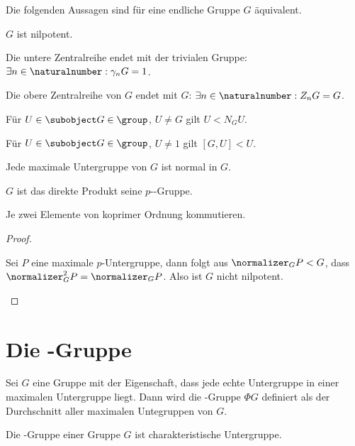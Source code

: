\begin{theorem}
    Die folgenden Aussagen sind für eine endliche Gruppe $G$ äquivalent.
    \begin{statements}
            \item $G$ ist nilpotent.
            \item Die untere Zentralreihe endet mit der trivialen Gruppe: $\exists n\in\naturalnumber:\gamma_n G = 1$.
            \item Die obere Zentralreihe von $G$ endet mit $G$: $\exists n\in\naturalnumber : Z_n G = G$.
            \item Für $U\in\subobject G\in\group$, $U\neq G$ gilt $U<N_G U$.
            \item Für $U\in\subobject G\in\group$, $U\neq 1$ gilt $[G,U]<U$.
            \item Jede maximale Untergruppe von $G$ ist normal in $G$.
            \item $G$ ist das direkte Produkt seine $p$--Gruppe.
            \item Je zwei Elemente von koprimer Ordnung kommutieren.
    \end{statements}
\end{theorem}

\begin{proof}
    \begin{statements}
        \item Sei $P$ eine maximale $p$-Untergruppe, dann folgt aus $\normalizer_G P < G$, dass $\normalizer^2_G P = \normalizer_G
    P$. Also ist $G$ nicht nilpotent.
    \end{statements}
\end{proof}

\section{Die -Gruppe}

\begin{definition}
    Sei $G$ eine Gruppe mit der Eigenschaft, dass jede echte Untergruppe in einer maximalen Untergruppe liegt. Dann wird die -Gruppe $\Phi G$ definiert als der Durchschnitt aller maximalen Untegruppen von $G$.
\end{definition}

\begin{lemma}
    Die -Gruppe einer Gruppe $G$ ist charakteristische Untergruppe.
\end{lemma}

